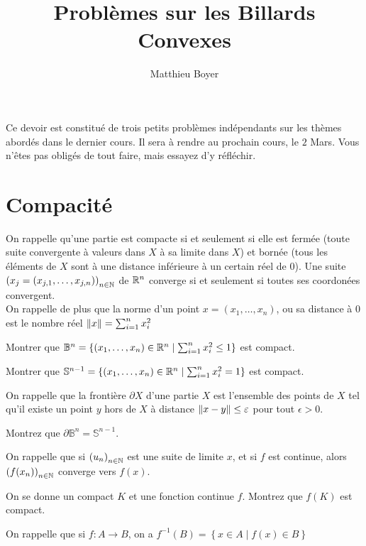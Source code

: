 \documentclass{cours}
\title{Problèmes sur les Billards Convexes}
\author{Matthieu Boyer}
\date{}
\begin{document}
Ce devoir est constitué de trois petits problèmes indépendants sur les thèmes abordés dans le dernier cours. Il sera à rendre au prochain cours, le $2$ Mars. Vous n'êtes pas obligés de tout faire, mais essayez d'y réfléchir. 

\section{Compacité}
On rappelle qu'une partie est compacte si et seulement si elle est fermée (toute suite convergente à valeurs dans $X$ à sa limite dans $X$) et bornée (tous les éléments de $X$ sont à une distance inférieure à un certain réel de $0$). Une suite $\left(x_{j} = \left(x_{j, 1}, \ldots, x_{j, n}\right)\right)_{n\in \mathbb{N}}$ de $\mathbb{R}^{n}$ converge si et seulement si toutes ses coordonées convergent. \\
On rappelle de plus que la norme d'un point $x = (x_{1}, \ldots, x_{n})$, ou sa distance à $0$ est le nombre réel $\left\lVert x \right\rVert = \sum_{i = 1}^{n} x_{i}^{2}$\\

\begin{question}
    Montrer que $\mathbb{B}^{n} = \{(x_{1}, \ldots, x_{n})\in \mathbb{R}^{n} \mid \sum_{i = 1}^{n} x_{i}^{2} \leq 1\}$ est compact.
\end{question}

\begin{question}
    Montrer que $\mathbb{S}^{n - 1} = \{(x_{1}, \ldots, x_{n})\in \mathbb{R}^{n} \mid \sum_{i = 1}^{n} x_{i}^{2} = 1\}$ est compact.
\end{question}

On rappelle que la frontière $\partial X$ d'une partie $X$ est l'ensemble des points de $X$ tel qu'il existe un point $y$ hors de $X$ à distance $\left\lVert x - y \right\rVert \leq \varepsilon$ pour tout $\epsilon > 0$.
\begin{question}
    Montrez que $\partial\mathbb{B}^{n} = \mathbb{S}^{n - 1}$.
\end{question}

On rappelle que si $\left(u_{n}\right)_{n \in \mathbb{N}}$ est une suite de limite $x$, et si $f$ est continue, alors $\left(f(x_{n})\right)_{n \in \mathbb{N}}$ converge vers $f(x)$.

\begin{question}
    On se donne un compact $K$ et une fonction continue $f$. Montrez que $f(K)$ est compact.
\end{question}

On rappelle que si $f: A \to B$, on a $f^{-1}(B) = \left\{x \in A \mid f(x) \in B\right\}$
\end{document}
